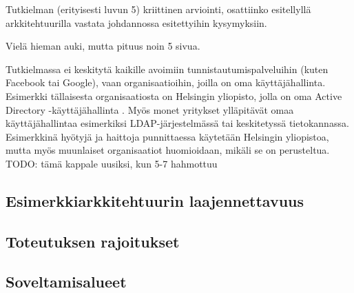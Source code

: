 Tutkielman (erityisesti luvun 5) kriittinen arviointi, osattiinko esitellyllä arkkitehtuurilla vastata johdannossa esitettyihin kysymyksiin.

Vielä hieman auki, mutta pituus noin 5 sivua.

Tutkielmassa ei keskitytä kaikille avoimiin tunnistautumispalveluihin (kuten Facebook tai Google), vaan organisaatioihin, joilla on oma käyttäjähallinta. Esimerkki tällaisesta organisaatiosta on Helsingin yliopisto, jolla on oma Active Directory -käyttäjähallinta \cite{tietotekniikkaa}. Myös monet yritykset ylläpitävät omaa käyttäjähallintaa esimerkiksi LDAP-järjestelmässä tai keskitetyssä tietokannassa. Esimerkkinä hyötyjä ja haittoja punnittaessa käytetään Helsingin yliopistoa, mutta myös muunlaiset organisaatiot huomioidaan, mikäli se on perusteltua. TODO: tämä kappale uusiksi, kun 5-7 hahmottuu

\subsection{Esimerkkiarkkitehtuurin laajennettavuus}


\subsection{Toteutuksen rajoitukset}


\subsection{Soveltamisalueet}
